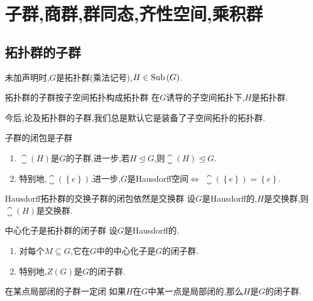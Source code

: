 \chapter{子群,商群,群同态,齐性空间,乘积群}

\section{拓扑群的子群}

未加声明时,$G$是拓扑群(乘法记号),$H\in\operatorname{Sub}\left(G\right)$.

\begin{proposition}{拓扑群的子群按子空间拓扑构成拓扑群}{}
	在$G$诱导的子空间拓扑下,$H$是拓扑群.
\end{proposition}

\begin{convention}{}{}
	今后,论及拓扑群的子群,我们总是默认它是装备了子空间拓扑的拓扑群.
\end{convention}

\begin{proposition}{子群的闭包是子群}{}
	\begin{enumerate}
		\item $\closure\left(H\right)$是$G$的子群.进一步,若$H\unlhd G$,则$\closure\left(H\right)\unlhd G$.
		\item 特别地,$\closure\left(\left\{e\right\}\right)$.进一步,$G$是Hausdorff空间$\iff$ $\closure\left(\left\{e\right\}\right)=\left\{e\right\}$.
	\end{enumerate}
\end{proposition}

\begin{proposition}{Hausdorff拓扑群的交换子群的闭包依然是交换群}{}
	设$G$是Hausdorff的,$H$是交换群,则$\closure\left(H\right)$是交换群.
\end{proposition}

\begin{proposition}{中心化子是拓扑群的闭子群}{}
	设$G$是Hausdorff的.
	\begin{enumerate}
		\item 对每个$M\subseteq G$,它在$G$中的中心化子是$G$的闭子群.
		\item 特别地,$Z\left(G\right)$是$G$的闭子群.
	\end{enumerate}
\end{proposition}

\begin{proposition}{在某点局部闭的子群一定闭}{}
	如果$H$在$G$中某一点是局部闭的,那么$H$是$G$的闭子群.
\end{proposition}

